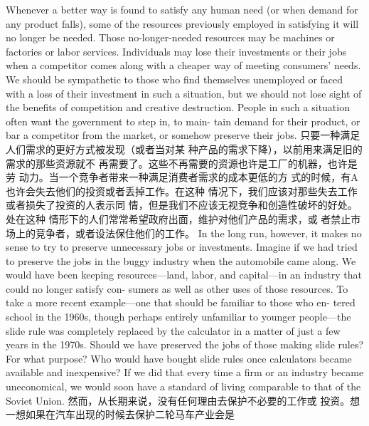 \begin{paracol}{2}
Whenever a better way is found to satisfy any human need (or
when demand for any product falls), some of the resources previously employed in satisfying it will no longer be needed.
Those no-longer-needed resources may be machines or factories
or labor services. Individuals may lose their investments or their
jobs when a competitor comes along with a cheaper way of
meeting consumers' needs. We should be sympathetic to those
who find themselves unemployed or faced with a loss of their
investment in such a situation, but we should not lose sight of
the benefits of competition and creative destruction. People in such a situation often want the government to step in, to main-
tain demand for their product, or bar a competitor from the
market, or somehow preserve their jobs.
\switchcolumn
只要一种满足人们需求的更好方式被发现（或者当对某
种产品的需求下降），以前用来满足旧的需求的那些资源就不
再需要了。这些不再需要的资源也许是工厂的机器，也许是劳
动力。当一个竞争者带来一种满足消费者需求的成本更低的方
式的时候，有A 也许会失去他们的投资或者丢掉工作。在这种
情况下，我们应该对那些失去工作或者损失了投资的人表示同
情，但是我们不应该无视竞争和创造性破坏的好处。处在这种
情形下的人们常常希望政府出面，维护对他们产品的需求，或
者禁止市场上的竞争者，或者设法保住他们的工作。
\switchcolumn*
In the long run, however, it makes no sense to try to preserve
unnecessary jobs or investments. Imagine if we had tried to preserve the jobs in the buggy industry when the automobile came
along. We would have been keeping resources---land, labor,
and capital---in an industry that could no longer satisfy con-
sumers as well as other uses of those resources. To take a more
recent example---one that should be familiar to those who en-
tered school in the 1960s, though perhaps entirely unfamiliar
to younger people---the slide rule was completely replaced by
the calculator in a matter of just a few years in the 1970s.
Should we have preserved the jobs of those making slide rules?
For what purpose? Who would have bought slide rules once
calculators became available and inexpensive? If we did that
every time a firm or an industry became uneconomical, we
would soon have a standard of living comparable to that of the
Soviet Union.
\switchcolumn
然而，从长期来说，没有任何理由去保护不必要的工作或
投资。想一想如果在汽车出现的时候去保护二轮马车产业会是

\end{paracol}
